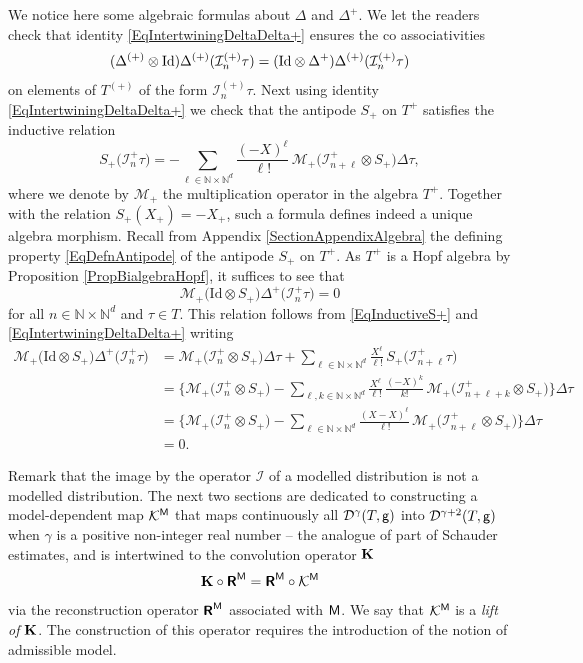 \documentclass[10pt, reqno]{amsart}
\numberwithin{subsection}{section}
\numberwithin{subsubsection}{subsection}
\numberwithin{equation}{section} %
\theoremstyle{mystyle}
\theoremstyle{mystyle2}
\theoremstyle{mystyle3}
\newcommand{\iden}{\text{\rm Id}}
\newcommand\bbN{\mathbb{N}}
\newcommand{\mcD}{\mathcal{D}}
\newcommand{\mcI}{\mathcal{I}}
\newcommand{\mcK}{\mathcal{K}}
\newcommand{\mcM}{\mathcal{M}}
\begin{document}
We notice here some algebraic formulas about $\Delta$ and $\Delta^+$. We let the readers check that identity \eqref{EqIntertwiningDeltaDelta+} ensures the co associativities 
\begin{align*}
(\Delta^{(+)}\otimes\iden)\Delta^{(+)}(\mcI_n^{(+)}\tau) = (\iden\otimes\Delta^+)\Delta^{(+)}(\mcI_n^{(+)}\tau)
\end{align*}
on elements of $T^{(+)}$ of the form $\mcI_n^{(+)}\tau$. Next using identity \eqref{EqIntertwiningDeltaDelta+} we check that the antipode $S_+$ on $T^+$ satisfies the inductive relation 
\begin{equation} \label{EqInductiveS+}
S_+\big(\mcI_n^+\tau\big) = -\sum_  {\ell\in\bbN\times\bbN^d}\frac{(-X)^\ell}{\ell!}\,\mcM_+\big(\mcI^+_{n+\ell}\otimes S_+\big)\Delta\tau,
\end{equation}
where we denote by $\mcM_+$ the multiplication operator in the algebra $T^+$. Together with the relation $S_+(X_+)=-X_+$, such a formula defines indeed a unique algebra morphism. Recall from Appendix {\sf \ref{SectionAppendixAlgebra}} the defining property \eqref{EqDefnAntipode} of the antipode $S_+$ on $T^+$. As $T^+$ is a Hopf algebra by Proposition \ref{PropBialgebraHopf}, it suffices to see that
$$
\mcM_+\big(\textrm{Id}\otimes S_+\big)\Delta^+\big(\mcI^+_n\tau\big) = 0
$$
for all $n\in\bbN\times\bbN^d$ and $\tau\in T$. This relation follows from \eqref{EqInductiveS+} and \eqref{EqIntertwiningDeltaDelta+} writing
\begin{equation*} \begin{split}
\mcM_+\big(\textrm{Id}\otimes S_+\big)\Delta^+\big(\mcI^+_n\tau\big) &= 
\mcM_+\big(\mcI^+_n\otimes S_+\big)\Delta\tau + \sum_{\ell\in\bbN\times\bbN^d}\frac{X^\ell}{\ell!}\,S_+\big(\mcI^+_{n+\ell}\tau\big)  \\
&= \Big\{\mcM_+\big(\mcI^+_n\otimes S_+\big) -  \sum_{\ell,k\in\bbN\times\bbN^d}\frac{X^\ell}{\ell!}\,\frac{(-X)^k}{k!}\,\mcM_+\big(\mcI^+_{n+\ell+k}\otimes S_+\big)\Big\}\Delta\tau   \\
&= \Big\{\mcM_+\big(\mcI^+_n\otimes S_+\big) -  \sum_{\ell\in\bbN\times\bbN^d}\frac{(X-X)^\ell}{\ell!}\,\mcM_+\big(\mcI^+_{n+\ell}\otimes S_+\big)\Big\}\Delta\tau   \\
&= 0.
\end{split} \end{equation*}

\smallskip

Remark that the image by the operator $\mcI$ of a modelled distribution is not a modelled distribution. The next two sections are dedicated to 
constructing a model-dependent map $\mcK^{\sf M}$ that maps continuously all $\mcD^\gamma(T,\sf g)$ into $\mcD^{\gamma+2}(T,\sf g)$ when $\gamma$ is a positive non-integer real number -- the analogue of part of Schauder 
estimates, and is intertwined to the convolution operator $\bf K$
$$
{\bf K}\circ\textbf{\textsf{R}}^{\sf M} = \textbf{\textsf{R}}^{\sf M}\circ \mcK^{\sf M}
$$
via the reconstruction operator $\textbf{\textsf{R}}^{\sf M}$ associated with $\sf M$. We say that $\mcK^{\sf M}$ is a {\it lift of} $\bf K$. The construction of this operator requires the introduction of the notion of admissible model.
\end{document}

